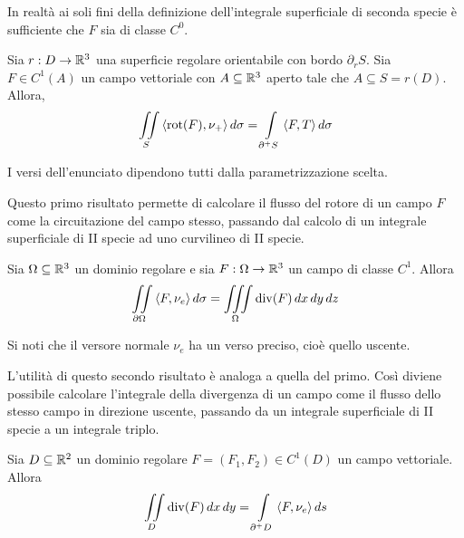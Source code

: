  \begin{oss}
     In realtà ai soli fini della definizione dell'integrale superficiale di seconda specie è sufficiente che $F$ sia di classe $C^0$.
 \end{oss}
  \begin{theorem} \label{Teo: Teorema di Stokes}
     Sia $r: D \to \mathbb{R}^3$ una superficie regolare orientabile con bordo $\partial_r S$. Sia $F \in C^1(A)$ un campo vettoriale con $A \subseteq \mathbb{R}^3$ aperto tale che $A \subseteq S=r(D)$. Allora,
     \begin{equation}
         \iint\limits_{S} {\langle \operatorname{rot}(F), \nu_+ \rangle}\, d\sigma = \int\limits_{\partial^+ S}{\langle F, T \rangle}\, d\sigma
     \end{equation}
 \end{theorem}
 \begin{oss}
     I versi dell'enunciato dipendono tutti dalla parametrizzazione scelta.
 \end{oss}
 Questo primo risultato permette di calcolare il flusso del rotore di un campo $F$ come la circuitazione del campo stesso, passando dal calcolo di un integrale superficiale di II specie ad uno curvilineo di II specie.
 \begin{theorem} \label{Teo: Teorema della divergenza}
     Sia $\Omega \subseteq \mathbb{R}^3$ un dominio regolare e sia $F: \Omega \to \mathbb{R}^3$ un campo di classe $C^1$. Allora
     \begin{equation}
         \iint\limits_{\partial \Omega}{\langle F, \nu_e\rangle}\, d\sigma = \iiint\limits_{\Omega}{\operatorname{div}(F)}\, dx\, dy\, dz
     \end{equation}
 \end{theorem}
 \begin{oss}
     Si noti che il versore normale $\nu_e$ ha un verso preciso, cioè quello uscente.
 \end{oss}
 L'utilità di questo secondo risultato è analoga a quella del primo. Così diviene possibile calcolare l'integrale della divergenza di un campo come il flusso dello stesso campo in direzione uscente, passando da un integrale superficiale di II specie a un integrale triplo.
 \begin{theorem}
     Sia $D \subseteq \mathbb{R}^2$ un dominio regolare $F=(F_1, F_2) \in C^1(D)$ un campo vettoriale. Allora 
     \begin{equation}
         \iint\limits_{D} {\operatorname{div}(F)}\,dx\,dy = \int\limits_{\partial^+ D}{\langle F, \nu_e \rangle}\,ds
     \end{equation}
 \end{theorem}
